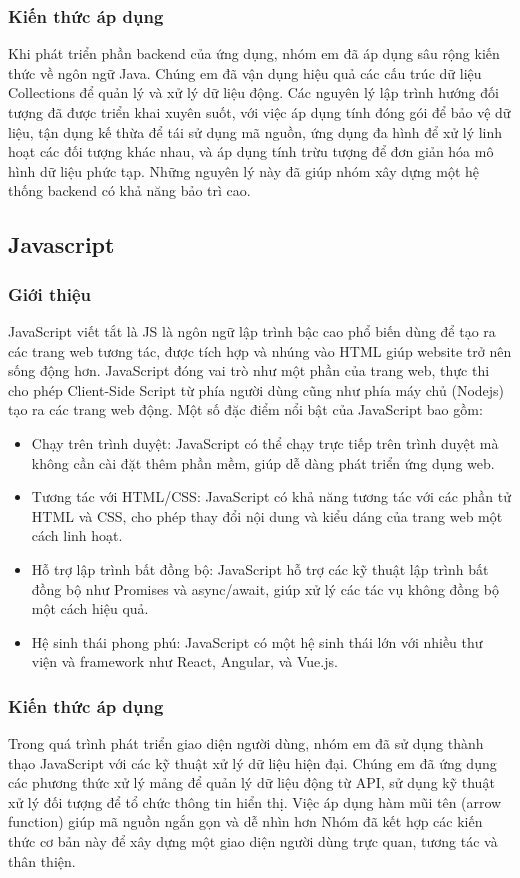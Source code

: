 \documentclass[../BTL.tex]{subfiles}
\begin{document}
\subsubsection{Kiến thức áp dụng }
Khi phát triển phần backend của ứng dụng, nhóm em đã áp dụng sâu rộng kiến thức về ngôn ngữ Java. Chúng em đã vận dụng hiệu quả các cấu trúc dữ liệu Collections để quản lý và xử lý dữ liệu động. Các nguyên lý lập trình hướng đối tượng đã được triển khai xuyên suốt, với việc áp dụng tính đóng gói để bảo vệ dữ liệu, tận dụng kế thừa để tái sử dụng mã nguồn, ứng dụng đa hình để xử lý linh hoạt các đối tượng khác nhau, và áp dụng tính trừu tượng để đơn giản hóa mô hình dữ liệu phức tạp. Những nguyên lý này đã giúp nhóm xây dựng một hệ thống backend có khả năng bảo trì cao.
\subsection{Javascript}
\subsubsection{ Giới thiệu}
JavaScript viết tắt là JS là ngôn ngữ lập trình bậc cao phổ biến dùng để tạo ra các trang web tương tác, được tích hợp và nhúng vào HTML giúp website trở nên sống động hơn. JavaScript đóng vai trò như một phần của trang web, thực thi cho phép Client-Side Script từ phía người dùng cũng như phía máy chủ (Nodejs) tạo ra các trang web động. Một số đặc điểm nổi bật của JavaScript bao gồm:

\begin{itemize}
    \item Chạy trên trình duyệt: JavaScript có thể chạy trực tiếp trên trình duyệt mà không cần cài đặt thêm phần mềm, giúp dễ dàng phát triển ứng dụng web.
    \item Tương tác với HTML/CSS: JavaScript có khả năng tương tác với các phần tử HTML và CSS, cho phép thay đổi nội dung và kiểu dáng của trang web một cách linh hoạt.
    \item Hỗ trợ lập trình bất đồng bộ: JavaScript hỗ trợ các kỹ thuật lập trình bất đồng bộ như Promises và async/await, giúp xử lý các tác vụ không đồng bộ một cách hiệu quả.
    \item Hệ sinh thái phong phú: JavaScript có một hệ sinh thái lớn với nhiều thư viện và framework như React, Angular, và Vue.js.
\end{itemize}
\subsubsection{ Kiến thức áp dụng}
Trong quá trình phát triển giao diện người dùng, nhóm em đã sử dụng thành thạo JavaScript với các kỹ thuật xử lý dữ liệu hiện đại. Chúng em đã ứng dụng các phương thức xử lý mảng để quản lý dữ liệu động từ API, sử dụng kỹ thuật xử lý đối tượng để tổ chức thông tin hiển thị. Việc áp dụng hàm mũi tên (arrow function) giúp mã nguồn ngắn gọn và dễ nhìn hơn Nhóm đã kết hợp các kiến thức cơ bản này để xây dựng một giao diện người dùng trực quan, tương tác và thân thiện.
\end{document}
